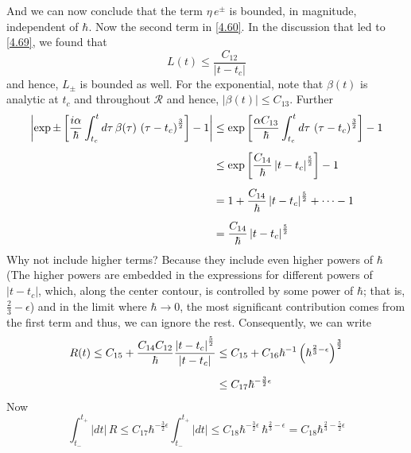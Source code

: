 \documentclass[12pt,a4paper]{article}
\begin{document}
	And we can now conclude that the term $\eta\, e^{\pm}$ is bounded, in magnitude, independent of $\hbar$. Now the second term in \eqref{4.60}. In the discussion that led to \eqref{4.69}, we found that
	\begin{equation}
		L(t) \leq \dfrac{C_{12}}{ \left| t - t_{c} \right|} \label{4.72}
	\end{equation}
	and hence, $L_{\pm}$ is bounded as well. For the exponential, note that $\beta(t)$ is analytic at $t_{c}$ and throughout $\mathcal{R}$ and hence, $\left| \beta(t) \right| \leq C_{13}$. Further
	\begin{align}
		\left| \exp \pm \left[ \frac{i\alpha}{\hbar} \int_{t_{c}}^{t} d\tau\, \beta(\tau)\, \left( \tau - t_{c} \right)^{\frac{3}{2}} \right] - 1 \right| &\leq \exp \left[ \frac{\alpha C_{13}}{\hbar} \int_{t_{c}}^{t} d\tau\, \left( \tau - t_{c} \right)^{\frac{3}{2}} \right] - 1 \notag \\[5pt]
		&\leq \exp \left[ \frac{C_{14}}{\hbar} \left| t - t_{c} \right|^{\frac{5}{2}} \right] - 1 \notag \\[5pt]
		&= 1 + \frac{C_{14}}{\hbar} \left| t - t_{c} \right|^{\frac{5}{2}} + \cdots -1 \notag \\[5pt]
		&= \frac{C_{14}}{\hbar} \left| t - t_{c} \right|^{\frac{5}{2}} \label{4.73}
	\end{align}
	Why not include higher terms? Because they include even higher powers of $\hbar$ (The higher powers are embedded in the expressions for different powers of $\left| t - t_{c} \right|$, which, along the center contour, is controlled by some power of $\hbar$; that is,$\frac{2}{3} - \epsilon$) and in the limit where $\hbar \rightarrow 0$, the most significant contribution comes from the first term and thus, we can ignore the rest. Consequently, we can write
	\begin{align}
		R(t) \leq C_{15} + \dfrac{C_{14} C_{12}}{\hbar} \dfrac{\left| t - t_{c} \right|^{\frac{5}{2}}}{\left| t - t_{c} \right|} &\leq C_{15} + C_{16} \hbar^{-1} \left( \hbar^{\frac{2}{3} - \epsilon} \right)^{\frac{3}{2}} \notag \\[5pt]
		&\leq C_{17} \hbar^{-\frac{3}{2} \epsilon} \label{4.74}
	\end{align}
	Now 
	\begin{equation}
		\int_{t_{-}}^{t_{+}} \left| dt \right|\, R \leq C_{17} \hbar^{-\frac{3}{2} \epsilon} \int_{t_{-}}^{t_{+}} \left| dt \right| \leq C_{18} \hbar^{-\frac{3}{2} \epsilon}\, \hbar^{\frac{2}{3} - \epsilon} = C_{18} \hbar^{\frac{2}{3} - \frac{5}{2} \epsilon} \label{4.75}
	\end{equation}
\end{document}
